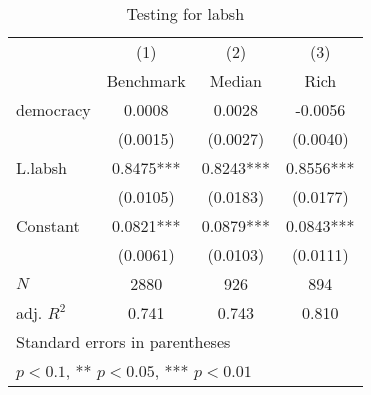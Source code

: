 \begin{table}[htbp]\centering
\def\sym#1{\ifmmode^{#1}\else\(^{#1}\)\fi}
\caption{Testing for labsh \label{tab:regression3}}
\begin{tabular}{l*{3}{c}}
\hline\hline
            &\multicolumn{1}{c}{(1)}&\multicolumn{1}{c}{(2)}&\multicolumn{1}{c}{(3)}\\
            &\multicolumn{1}{c}{Benchmark}&\multicolumn{1}{c}{Median}&\multicolumn{1}{c}{Rich}\\
\hline
democracy   &      0.0008   &      0.0028   &     -0.0056   \\
            &    (0.0015)   &    (0.0027)   &    (0.0040)   \\
[1em]
L.labsh     &      0.8475***&      0.8243***&      0.8556***\\
            &    (0.0105)   &    (0.0183)   &    (0.0177)   \\
[1em]
Constant    &      0.0821***&      0.0879***&      0.0843***\\
            &    (0.0061)   &    (0.0103)   &    (0.0111)   \\
\hline
\(N\)       &        2880   &         926   &         894   \\
adj. \(R^{2}\)&       0.741   &       0.743   &       0.810   \\
\hline\hline
\multicolumn{4}{l}{\footnotesize Standard errors in parentheses}\\
\multicolumn{4}{l}{\footnotesize * \(p<0.1\), ** \(p<0.05\), *** \(p<0.01\)}\\
\end{tabular}
\end{table}
